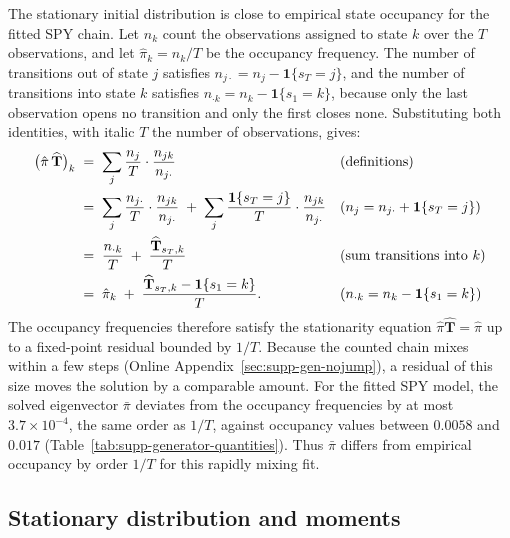 The stationary initial distribution is close to empirical state occupancy for the fitted SPY chain. Let $n_k$ count the observations
assigned to state $k$ over the $T$ observations, and let
$\hat\pi_k = n_k / T$ be the occupancy frequency. The number of
transitions out of state $j$ satisfies
$n_{j\cdot} = n_j - \mathbf{1}\{s_T = j\}$, and the number of
transitions into state $k$ satisfies
$n_{\cdot k} = n_k - \mathbf{1}\{s_1 = k\}$, because only the last
observation opens no transition and only the first closes none.
Substituting both identities, with italic $T$ the number of
observations, gives:
\begin{align}
  \big(\hat\pi\, \widehat{\mathbf{T}}\big)_k
   &\;=\; \sum_j \frac{n_j}{T} \cdot \frac{n_{jk}}{n_{j \cdot}}
     && \text{(definitions)} \notag \\
   &\;=\; \sum_j \frac{n_{j \cdot}}{T} \cdot \frac{n_{jk}}{n_{j \cdot}}
     \;+\; \sum_j \frac{\mathbf{1}\{s_T = j\}}{T}
       \cdot \frac{n_{jk}}{n_{j \cdot}}
     && \text{($n_j = n_{j\cdot} + \mathbf{1}\{s_T = j\}$)} \notag \\
   &\;=\; \frac{n_{\cdot k}}{T}
     \;+\; \frac{\widehat{\mathbf{T}}_{s_T, k}}{T}
     && \text{(sum transitions into $k$)} \notag \\
   &\;=\; \hat\pi_k
     \;+\; \frac{\widehat{\mathbf{T}}_{s_T, k}
       - \mathbf{1}\{s_1 = k\}}{T}.
     && \text{($n_{\cdot k} = n_k - \mathbf{1}\{s_1 = k\}$)}
  \label{eq:supp-fixed-point}
\end{align}
The occupancy frequencies therefore satisfy the stationarity equation
$\hat\pi \widehat{\mathbf{T}} = \hat\pi$ up to a fixed-point residual
bounded by $1/T$. Because the counted chain mixes within a few steps
(Online Appendix~\ref{sec:supp-gen-nojump}), a residual of this size
moves the solution by a comparable amount. For the fitted SPY model,
the solved eigenvector $\bar\pi$ deviates from the occupancy
frequencies by at most $3.7 \times 10^{-4}$, the same order as $1/T$,
against occupancy values
between $0.0058$ and $0.017$ (Table~\ref{tab:supp-generator-quantities}). Thus $\bar\pi$ differs from empirical occupancy by order $1/T$ for this rapidly mixing fit.

\subsection{Stationary distribution and moments}
\label{sec:supp-gen-moments}

